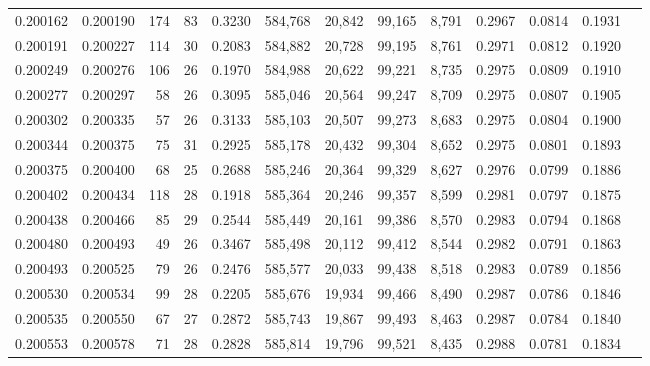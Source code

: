 \begin{tabular}{rrrrrrrrrrrrr}
0.200162 & 0.200190 &   174 &  83 &                                     0.3230 & 584,768 &  20,842 &  99,165 &   8,791 & 0.2967 & 0.0814 & 0.1931 \\
0.200191 & 0.200227 &   114 &  30 &                                     0.2083 & 584,882 &  20,728 &  99,195 &   8,761 & 0.2971 & 0.0812 & 0.1920 \\
0.200249 & 0.200276 &   106 &  26 &                                     0.1970 & 584,988 &  20,622 &  99,221 &   8,735 & 0.2975 & 0.0809 & 0.1910 \\
0.200277 & 0.200297 &    58 &  26 &                                     0.3095 & 585,046 &  20,564 &  99,247 &   8,709 & 0.2975 & 0.0807 & 0.1905 \\
0.200302 & 0.200335 &    57 &  26 &                                     0.3133 & 585,103 &  20,507 &  99,273 &   8,683 & 0.2975 & 0.0804 & 0.1900 \\
0.200344 & 0.200375 &    75 &  31 &                                     0.2925 & 585,178 &  20,432 &  99,304 &   8,652 & 0.2975 & 0.0801 & 0.1893 \\
0.200375 & 0.200400 &    68 &  25 &                                     0.2688 & 585,246 &  20,364 &  99,329 &   8,627 & 0.2976 & 0.0799 & 0.1886 \\
0.200402 & 0.200434 &   118 &  28 &                                     0.1918 & 585,364 &  20,246 &  99,357 &   8,599 & 0.2981 & 0.0797 & 0.1875 \\
0.200438 & 0.200466 &    85 &  29 &                                     0.2544 & 585,449 &  20,161 &  99,386 &   8,570 & 0.2983 & 0.0794 & 0.1868 \\
0.200480 & 0.200493 &    49 &  26 &                                     0.3467 & 585,498 &  20,112 &  99,412 &   8,544 & 0.2982 & 0.0791 & 0.1863 \\
0.200493 & 0.200525 &    79 &  26 &                                     0.2476 & 585,577 &  20,033 &  99,438 &   8,518 & 0.2983 & 0.0789 & 0.1856 \\
0.200530 & 0.200534 &    99 &  28 &                                     0.2205 & 585,676 &  19,934 &  99,466 &   8,490 & 0.2987 & 0.0786 & 0.1846 \\
0.200535 & 0.200550 &    67 &  27 &                                     0.2872 & 585,743 &  19,867 &  99,493 &   8,463 & 0.2987 & 0.0784 & 0.1840 \\
0.200553 & 0.200578 &    71 &  28 &                                     0.2828 & 585,814 &  19,796 &  99,521 &   8,435 & 0.2988 & 0.0781 & 0.1834 \\

\end{tabular}
